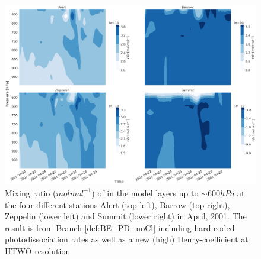 \begin{figure}[h]
    \centering
    \includegraphics[width=\linewidth]{Chapter6_Results/images/Vert_StationComp_2001/vertHBr_HTWO_step3.png}
    \caption{Mixing ratio ($mol mol^{-1}$) of  in the model layers up to $\sim 600 hPa$ at the four different stations Alert (top left), Barrow (top right), Zeppelin (lower left) and Summit (lower right) in April, 2001. The result is from Branch \ref{def:BE_PD_noCl} including hard-coded photodissociation rates as well as a new (high) Henry-coefficient at HTWO resolution}
    \label{fig:vertHBr_HTWO_step3}
\end{figure}